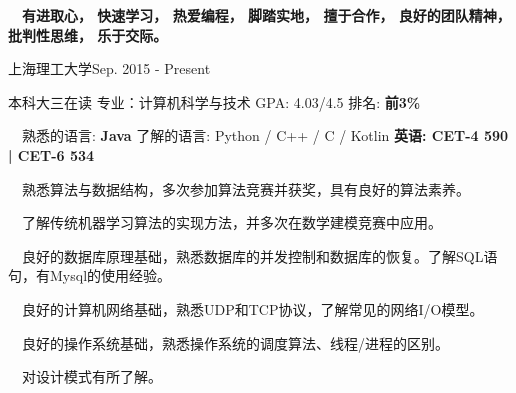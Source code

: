 \documentclass{sorahjy_cv}
\begin{document}
\pagestyle{empty}


\begin{cvHeader}
\end{cvHeader}


%
%

\begin{description}{}
	\item{\ \ }\textbf{有进取心， 快速学习， 热爱编程， 脚踏实地， 擅于合作， 良好的团队精神， 批判性思维， 乐于交际。}
\end{description}


%
%

\begin{sectionContentSimple}{上海理工大学}{Sep. 2015 - Present}
	\item 本科大三在读 \quad 专业：计算机科学与技术 \quad GPA: 4.03/4.5 \quad 排名: \textbf{前3\%} 
\end{sectionContentSimple}

%
%


%
%

\begin{description}{}
	\item{\ \ 熟悉的语言: } \textbf{Java} \quad 了解的语言: Python / C++ / C / Kotlin \quad \textbf{英语: CET-4 590 | CET-6 534}
	\item{\ \ }熟悉算法与数据结构，多次参加算法竞赛并获奖，具有良好的算法素养。
	\item{\ \ }了解传统机器学习算法的实现方法，并多次在数学建模竞赛中应用。
	\item{\ \ }良好的数据库原理基础，熟悉数据库的并发控制和数据库的恢复。了解SQL语句，有Mysql的使用经验。
	\item{\ \ }良好的计算机网络基础，熟悉UDP和TCP协议，了解常见的网络I/O模型。
	\item{\ \ }良好的操作系统基础，熟悉操作系统的调度算法、线程/进程的区别。
	\item{\ \ }对设计模式有所了解。
\end{description}

%
%
\end{document}
